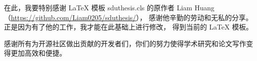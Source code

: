
\acknowledgment

在此，我要特别感谢 \LaTeX{} 模板 sduthesis.cls 的原作者 Liam Huang（\url{https://github.com/Liam0205/sduthesis/}），
感谢他辛勤的劳动和无私的分享。正是因为有了他的工作，我才能在此基础上进行修改， 得到当前的 \LaTeX{} 模板。

感谢所有为开源社区做出贡献的开发者们，你们的努力使得学术研究和论文写作变得更加高效和便捷。